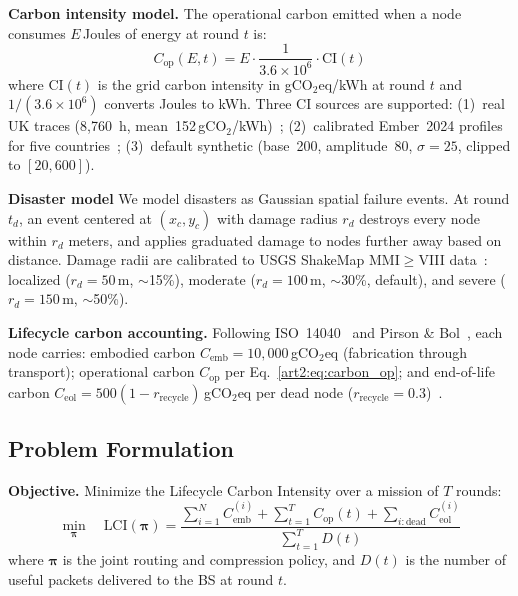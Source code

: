 \textbf{Carbon intensity model.}
The operational carbon emitted when a node consumes $E$\,Joules of energy at round $t$ is:
\begin{equation}
    C_{\text{op}}(E, t) = E \cdot \frac{1}{3.6 \times 10^6} \cdot \text{CI}(t)
    \label{art2:eq:carbon_op}
\end{equation}
where $\text{CI}(t)$ is the grid carbon intensity in gCO$_2$eq/kWh at round $t$ and $1/(3.6 \times 10^6)$ converts Joules to kWh.
Three CI sources are supported: (1)~real UK traces (8,760~h, mean~152\,gCO$_2$/kWh)~\cite{uk_carbon_api}; (2)~calibrated Ember~2024 profiles for five countries~\cite{ember2024}; (3)~default synthetic (base~200, amplitude~80, $\sigma{=}25$, clipped to $[20,600]$).

\textbf{Disaster model} 
We model disasters as Gaussian spatial failure events.
At round $t_d$, an event centered at $(x_c, y_c)$ with damage radius $r_d$ destroys every node within $r_d$ meters, and applies graduated damage to nodes further away based on distance.
Damage radii are calibrated to USGS ShakeMap MMI$\geq$VIII data~\cite{usgs_turkey2023, worden2005shakemap}: localized ($r_d{=}50$\,m, $\sim$15\%), moderate ($r_d{=}100$\,m, $\sim$30\%, default), and severe ($r_d{=}150$\,m, $\sim$50\%).

\textbf{Lifecycle carbon accounting.}
Following ISO~14040~\cite{iso14040} and Pirson \& Bol~\cite{pirson2021embodied}, each node carries: embodied carbon $C_{\text{emb}} = 10{,}000$\,gCO$_2$eq (fabrication through transport); operational carbon $C_{\text{op}}$ per Eq.~\eqref{art2:eq:carbon_op}; and end-of-life carbon $C_{\text{eol}} = 500(1 - r_{\text{recycle}})$\,gCO$_2$eq per dead node ($r_{\text{recycle}}{=}0.3$)~\cite{forti2024ewaste}.

\subsection{Problem Formulation}
\label{art2:sec:problem}

\textbf{Objective.}
Minimize the Lifecycle Carbon Intensity over a mission of $T$ rounds:
\begin{equation}
    \min_{\boldsymbol{\pi}} \quad \text{LCI}(\boldsymbol{\pi}) = \frac{\sum_{i=1}^{N} C_{\text{emb}}^{(i)} + \sum_{t=1}^{T} C_{\text{op}}(t) + \sum_{i:\text{dead}} C_{\text{eol}}^{(i)}}{\sum_{t=1}^{T} D(t)}
    \label{art2:eq:lci_formal}
\end{equation}
where $\boldsymbol{\pi}$ is the joint routing and compression policy, and $D(t)$ is the number of useful packets delivered to the BS at round $t$.

